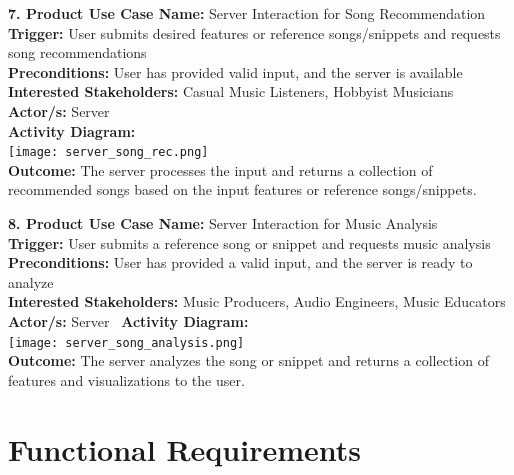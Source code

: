 \documentclass[12pt]{article}
\begin{document}
\vspace{1cm}

\textbf{7. Product Use Case Name:} Server Interaction for Song Recommendation \\
\textbf{Trigger:} User submits desired features or reference songs/snippets and requests song recommendations \\
\textbf{Preconditions:} User has provided valid input, and the server is available \\
\textbf{Interested Stakeholders:} Casual Music Listeners, Hobbyist Musicians \\
\textbf{Actor/s:} Server \\
\textbf{Activity Diagram:} \\
\texttt{[image: server\_song\_rec.png]} \\
\textbf{Outcome:} The server processes the input and returns a collection of recommended songs based on the input features or reference songs/snippets.

\vspace{1cm}

\textbf{8. Product Use Case Name:} Server Interaction for Music Analysis \\
\textbf{Trigger:} User submits a reference song or snippet and requests music analysis \\
\textbf{Preconditions:} User has provided a valid input, and the server is ready to analyze \\
\textbf{Interested Stakeholders:} Music Producers, Audio Engineers, Music Educators \\
\textbf{Actor/s:} Server \ \textbf{Activity Diagram:} \\
\texttt{[image: server\_song\_analysis.png]} \\
\textbf{Outcome:} The server analyzes the song or snippet and returns a collection of features and visualizations to the user.

\section{Functional Requirements}
\end{document}
